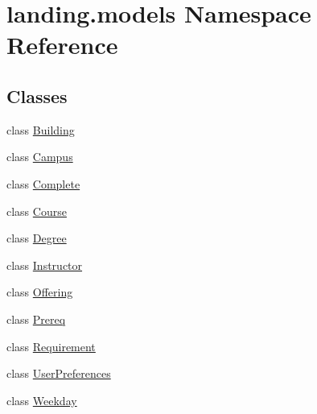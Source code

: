 \hypertarget{namespacelanding_1_1models}{}\section{landing.\+models Namespace Reference}
\label{namespacelanding_1_1models}
\subsection*{Classes}
\begin{DoxyCompactItemize}
\item 
class \mbox{\hyperlink{classlanding_1_1models_1_1Building}{Building}}
\item 
class \mbox{\hyperlink{classlanding_1_1models_1_1Campus}{Campus}}
\item 
class \mbox{\hyperlink{classlanding_1_1models_1_1Complete}{Complete}}
\item 
class \mbox{\hyperlink{classlanding_1_1models_1_1Course}{Course}}
\item 
class \mbox{\hyperlink{classlanding_1_1models_1_1Degree}{Degree}}
\item 
class \mbox{\hyperlink{classlanding_1_1models_1_1Instructor}{Instructor}}
\item 
class \mbox{\hyperlink{classlanding_1_1models_1_1Offering}{Offering}}
\item 
class \mbox{\hyperlink{classlanding_1_1models_1_1Prereq}{Prereq}}
\item 
class \mbox{\hyperlink{classlanding_1_1models_1_1Requirement}{Requirement}}
\item 
class \mbox{\hyperlink{classlanding_1_1models_1_1UserPreferences}{User\+Preferences}}
\item 
class \mbox{\hyperlink{classlanding_1_1models_1_1Weekday}{Weekday}}
\end{DoxyCompactItemize}

